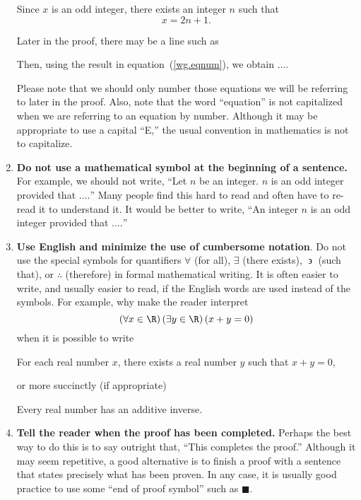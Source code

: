 \begin{enumerate}
Since  $x$  is an odd integer, there exists an integer  $n$  such that
\begin{equation}\label{wg.eqnum}
x = 2n + 1.
\end{equation}

\begin{flushleft}
Later in the proof, there may be a line such as
\begin{center}
Then, using the result in equation~(\ref{wg.eqnum}), we obtain $\ldots .$
\end{center}
Please note that we should only number those equations we will be referring to later in the proof.  
Also, note that the word ``equation'' is not capitalized when we are referring to an equation by number.  Although it may be appropriate to use a capital ``E,'' the usual convention in mathematics is not to capitalize.
\end{flushleft}

\item \textbf{Do not use a mathematical symbol at the beginning of a sentence.}\\
For example, we should not write, ``Let $n$ be an integer.  $n$ is an odd integer provided that $\ldots .$''  Many people find this hard to read and often have to re-read it to understand it.  It would be better to write, ``An integer $n$ is an odd integer provided that $\ldots .$''

\item \textbf{Use English and minimize the use of cumbersome notation}.  Do not use the special symbols for quantifiers $\forall$ (for all), 
$\exists$ (there exists), $\mathrel\backepsilon$ (such that), or $\therefore $ (therefore) in formal mathematical writing.  It is often easier to write, and usually easier to read, if the English words are used instead of the symbols.  For example, why make the reader interpret
\[
\left( \forall x \in \R \right) \left( \exists y \in \R \right)\left( x + y = 0 \right)
\]
when it is possible to write
\begin{center}
For each real number $x$, there exists a real number $y$ such that $x + y = 0$,
\end{center}
or more succinctly (if appropriate)
\begin{center}
Every real number has an additive inverse.
\end{center}
%


\item \textbf{Tell the reader when the proof has been completed.}
Perhaps the best way to do this is to say outright that, ``This completes the proof.''  Although it may seem repetitive, a good alternative is to finish a proof with a sentence that states precisely what has been proven.  In any case, it is usually good practice to use  some ``end of proof symbol'' such as  $\blacksquare$.  
 



\end{enumerate}
